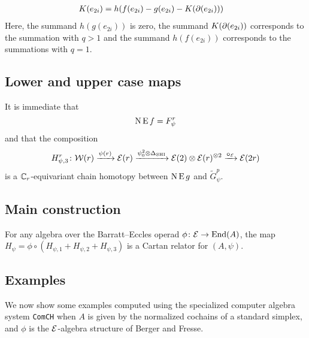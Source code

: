 \begin{align*}
	K(e_{2i}) &= h(f(e_{2i})-g(e_{2i})-K(\operatorname{\partial}(e_{2i})))
\end{align*}
Here, the summand $h(g(e_{2i}))$ is zero, the summand $K(\operatorname{\partial}(e_{2i}))$ corresponds to the summation with $q>1$ and the summand $h(f(e_{2i}))$ corresponds to the summations with $q=1$.


\subsection{Lower and upper case maps}

It is immediate that
\[
\operatorname{N}\operatorname{E} f = F_\psi^r
\]
and that the composition
\[
H_{\psi,3}^r \colon \mathcal{W}(r) \xrightarrow{\psi(r)} \mathcal{E}(r) \xrightarrow{\psi^2_0 \otimes \Delta_{\mathrm{SHI}}} \mathcal{E}(2) \otimes \mathcal{E}(r)^{\otimes 2} \xrightarrow{\bm{\circ}_{\mathcal{E}}} \mathcal{E}(2r)
\]
is a $\mathbb{C}_r$-equivariant chain homotopy between $\operatorname{N}\operatorname{E} g$ and $\widetilde G_\psi^p$.

\subsection{Main construction}

\begin{theorem}
	For any algebra over the Barratt--Eccles operad $\phi \colon \mathcal{E} \to \mathrm{End}(A)$, the map $H_\psi = \phi \circ (H_{\psi,1} + H_{\psi,2} + H_{\psi,3})$ is a Cartan relator for $(A,\psi)$.
\end{theorem}

\subsection{Examples}

We now show some examples computed using the specialized computer algebra system \texttt{ComCH} \cite{medina2021comch} when $A$ is given by the normalized cochains of a standard simplex, and $\phi$ is the $\mathcal{E}$-algebra structure of Berger and Fresse.
